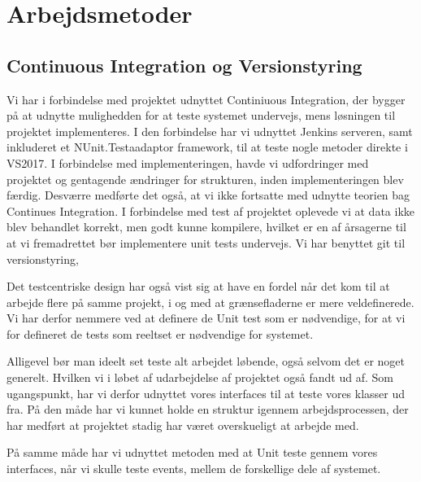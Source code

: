 
\section{Arbejdsmetoder}

\subsection{Continuous Integration og Versionstyring}

Vi har i forbindelse med projektet udnyttet Continiuous Integration, 
der bygger på at udnytte mulighedden for at teste systemet undervejs, 
mens løsningen til projektet implementeres. 
I den forbindelse har vi udnyttet Jenkins serveren, samt inkluderet 
et NUnit.Testaadaptor framework, til at teste nogle metoder direkte i VS2017. 
I forbindelse med implementeringen, havde vi udfordringer med projektet 
og gentagende ændringer for strukturen, inden implementeringen blev færdig. 
Desværre medførte det også, at vi ikke fortsatte med udnytte teorien bag Continues 
Integration. I forbindelse med test af projektet oplevede vi at data ikke blev 
behandlet korrekt, men godt kunne kompilere, hvilket er en af årsagerne til 
at vi fremadrettet bør implementere unit tests undervejs.
Vi har benyttet git til versionstyring, 

Det testcentriske design har også vist sig at have en fordel når det kom til at arbejde 
flere på samme projekt, i og med at grænsefladerne er mere veldefinerede. 
Vi har derfor nemmere ved at definere de Unit test som er nødvendige, 
for at vi for defineret de tests som reeltset er nødvendige for systemet. 

Alligevel bør man ideelt set teste alt arbejdet løbende, også selvom det er noget generelt.
Hvilken vi i løbet af udarbejdelse af projektet også fandt ud af.
Som ugangspunkt, har vi derfor udnyttet vores interfaces til at teste vores klasser ud fra. 
På den måde har vi kunnet holde en struktur igennem arbejdsprocessen, 
der har medført at projektet stadig har været overskueligt at arbejde med.

På samme måde har vi udnyttet metoden med at Unit teste gennem vores interfaces, når vi skulle teste events, mellem de forskellige dele af systemet.